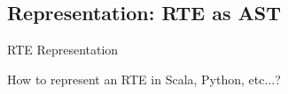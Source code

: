 \subsection{Representation: RTE as AST}


{  
\begin{frame}{ RTE Representation}

  How to represent an RTE in Scala, Python, etc...?


  \medskip
  
\end{frame}
}

\newsavebox\exnoteboxscala
\begin{lrbox}{\exnoteboxscala}
  \begin{minipage}{6.5cm}
    
  \end{minipage}
\end{lrbox}

\newsavebox\exnoteboxclojure
\begin{lrbox}{\exnoteboxclojure}
  \begin{minipage}{6.5cm}
    
  \end{minipage}
\end{lrbox}

\newsavebox\exnoteboxpython
\begin{lrbox}{\exnoteboxpython}
  \begin{minipage}{6.5cm}
    
  \end{minipage}
\end{lrbox}


